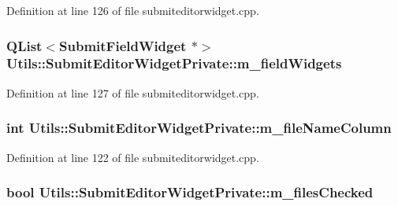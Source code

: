 \-Definition at line 126 of file submiteditorwidget.\-cpp.

\hypertarget{struct_utils_1_1_submit_editor_widget_private_abde8ff2c29d77121652458c01a6146d9}{
\subsubsection[{m\-\_\-field\-Widgets}]{\setlength{\rightskip}{0pt plus 5cm}\-Q\-List$<${\bf \-Submit\-Field\-Widget} $\ast$$>$ {\bf \-Utils\-::\-Submit\-Editor\-Widget\-Private\-::m\-\_\-field\-Widgets}}}\label{struct_utils_1_1_submit_editor_widget_private_abde8ff2c29d77121652458c01a6146d9}


\-Definition at line 127 of file submiteditorwidget.\-cpp.

\hypertarget{struct_utils_1_1_submit_editor_widget_private_ab07726bb11a9c52f9a0915170c6bb0fd}{
\subsubsection[{m\-\_\-file\-Name\-Column}]{\setlength{\rightskip}{0pt plus 5cm}int {\bf \-Utils\-::\-Submit\-Editor\-Widget\-Private\-::m\-\_\-file\-Name\-Column}}}\label{struct_utils_1_1_submit_editor_widget_private_ab07726bb11a9c52f9a0915170c6bb0fd}


\-Definition at line 122 of file submiteditorwidget.\-cpp.

\hypertarget{struct_utils_1_1_submit_editor_widget_private_aeb1241360fb4385d02bd11f12192dc51}{
\subsubsection[{m\-\_\-files\-Checked}]{\setlength{\rightskip}{0pt plus 5cm}bool {\bf \-Utils\-::\-Submit\-Editor\-Widget\-Private\-::m\-\_\-files\-Checked}}}\label{struct_utils_1_1_submit_editor_widget_private_aeb1241360fb4385d02bd11f12192dc51}


